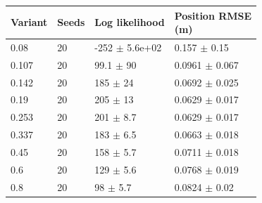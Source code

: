 \begin{tabular}{llll}
\toprule
Variant & Seeds & Log likelihood & \shortstack[l]{Position RMSE\\(m)} \\
\midrule
0.08 & 20 & -252 $\pm$ 5.6e+02 & 0.157 $\pm$ 0.15 \\
0.107 & 20 & 99.1 $\pm$ 90 & 0.0961 $\pm$ 0.067 \\
0.142 & 20 & 185 $\pm$ 24 & 0.0692 $\pm$ 0.025 \\
0.19 & 20 & 205 $\pm$ 13 & 0.0629 $\pm$ 0.017 \\
0.253 & 20 & 201 $\pm$ 8.7 & 0.0629 $\pm$ 0.017 \\
0.337 & 20 & 183 $\pm$ 6.5 & 0.0663 $\pm$ 0.018 \\
0.45 & 20 & 158 $\pm$ 5.7 & 0.0711 $\pm$ 0.018 \\
0.6 & 20 & 129 $\pm$ 5.6 & 0.0768 $\pm$ 0.019 \\
0.8 & 20 & 98 $\pm$ 5.7 & 0.0824 $\pm$ 0.02 \\
\bottomrule
\end{tabular}
